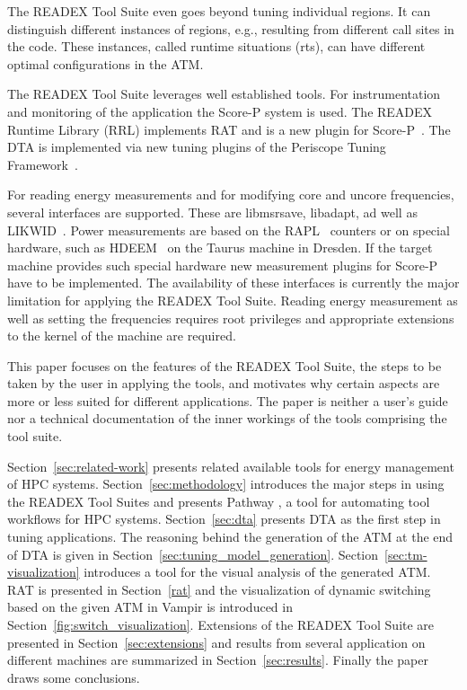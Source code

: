 \documentclass[runningheads]{llncs}
\begin{document}
The READEX Tool Suite even goes beyond tuning individual regions. It can distinguish different instances of regions, e.g., resulting from different call sites in the code. These instances, called runtime situations (rts), can have different optimal configurations in the ATM. 

The READEX Tool Suite leverages well established tools. For instrumentation and monitoring of the application the Score-P system is used. The READEX Runtime Library (RRL) implements RAT and is a new plugin for Score-P~\cite{knupfer2012score}. The DTA is implemented via new tuning plugins of the Periscope Tuning Framework~\cite{PTF2.0IEEE2016}.  

For reading energy measurements and for modifying core and uncore frequencies, several interfaces are supported. These are libmsrsave, libadapt, ad well as LIKWID~\cite{LIKWID}. Power measurements are based on the RAPL~\cite{Intel2018} counters or on special hardware, such as HDEEM~\cite{hdeem} on the Taurus machine in Dresden. If the target machine provides such special hardware new measurement plugins for Score-P have to be implemented. The availability of these interfaces is currently the major limitation for applying the READEX Tool Suite. Reading energy measurement as well as setting the frequencies requires root privileges and appropriate extensions to the kernel of the machine are required. 

This paper focuses on the features of the READEX Tool Suite, the steps to be taken by the user in applying the tools, and motivates why certain aspects are more or less suited for different applications. The paper is neither a user's guide nor a technical documentation of the inner workings of the tools comprising the tool suite. 

Section~\ref{sec:related-work} presents related available tools for energy management of HPC systems. Section~\ref{sec:methodology} introduces the major steps in using the READEX Tool Suites and presents Pathway \cite{Pathway:Petkov13}, a tool for automating tool workflows for HPC systems. Section~\ref{sec:dta} presents DTA as the first step in tuning applications. The reasoning behind the generation of the ATM at the end of DTA is given in Section~\ref{sec:tuning_model_generation}. Section~\ref{sec:tm-visualization} introduces a tool for the visual analysis of the generated ATM. RAT is presented in Section~\ref{rat} and the visualization of dynamic switching based on the given ATM in Vampir is introduced in Section~\ref{fig:switch_visualization}. Extensions of the READEX Tool Suite are presented in Section~\ref{sec:extensions} and results from several application on different machines are summarized in Section~\ref{sec:results}. Finally the paper draws some conclusions. 
\end{document}
